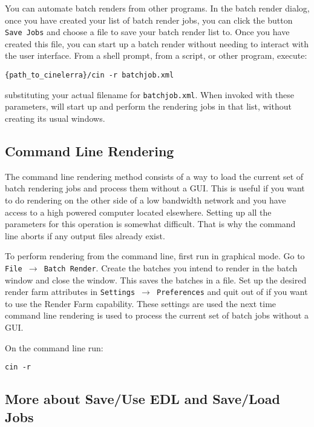 You can automate \CGG{} batch renders from other programs.  In the
batch render dialog, once you have created your list of batch render
jobs, you can click the button \texttt{Save Jobs} and choose a file
to save your batch render list to.  Once you have created this file,
you can start up a batch render without needing to interact with the
\CGG{} user interface.  From a shell prompt, from a script, or other
program, execute:

\begin{lstlisting}[style=sh]
{path_to_cinelerra}/cin -r batchjob.xml
\end{lstlisting} substituting your actual filename for
\texttt{batchjob.xml}.  When invoked with these parameters, \CGG{}
will start up and perform the rendering jobs in that list, without
creating its usual windows.

\subsection{Command Line Rendering}%
\label{sub:command_line_rendering}

The command line rendering method consists of a way to load the
current set of batch rendering jobs and process them without a
GUI\@. This is useful if you want to do rendering on the other side
of a low bandwidth network and you have access to a high powered
computer located elsewhere. Setting up all the parameters for this
operation is somewhat difficult. That is why the command line aborts
if any output files already exist.

To perform rendering from the command line, first run \CGG{} in
graphical mode. Go to \texttt{File $\rightarrow$ Batch
  Render}. Create the batches you intend to render in the batch window
and close the window. This saves the batches in a file. Set up the
desired render farm attributes in \texttt{Settings $\rightarrow$
  Preferences} and quit out of \CGG{} if you want to use the Render
Farm capability.  These settings are used the next time command line
rendering is used to process the current set of batch jobs without a
GUI\@.

On the command line run:

\begin{lstlisting}[style=sh]
cin -r
\end{lstlisting}

\subsection{More about Save/Use EDL and Save/Load Jobs}%
\label{sub:more_save_use_edl_jobs}

